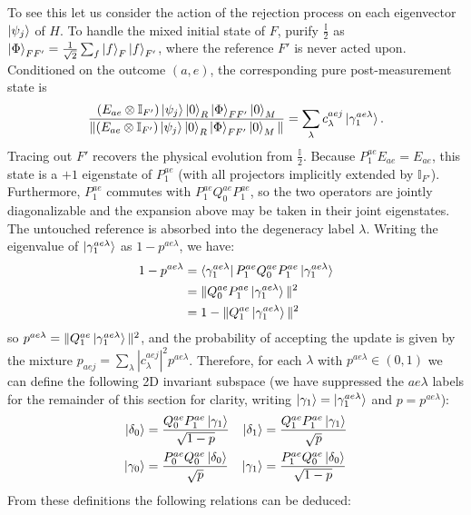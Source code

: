 \documentclass[aps,floatfix,10pt,amssymb,amsfont,amsmath,superscriptaddress,float,nofootinbib,longbibliography,nobalancelastpage,twocolumn]{revtex4-2}
\begin{document}
To see this let us consider the action of the rejection process on each eigenvector $\ket{\psi_j}$ of $H$. To handle the mixed initial state of $F$, purify $\frac{\mathbb{I}}{2}$ as $\ket{\Phi}_{FF'}=\frac{1}{\sqrt{2}}\sum_f\ket{f}_F\ket{f}_{F'}$, where the reference $F'$ is never acted upon. Conditioned on the outcome $(a,e)$, the corresponding pure post-measurement state is
\begin{equation}
    \frac{(E_{ae}\otimes\mathbb I_{F'})\ket{\psi_j}\ket{0}_R\ket{\Phi}_{FF'}\ket{0}_M}
    {\|(E_{ae}\otimes\mathbb I_{F'})\ket{\psi_j}\ket{0}_R\ket{\Phi}_{FF'}\ket{0}_M\|}
    = \sum_{\lambda} c_{\lambda}^{aej}\ket{\gamma_1^{ae \lambda}}.
\end{equation}
Tracing out $F'$ recovers the physical evolution from $\frac{\mathbb{I}}{2}$. Because $P_1^{ae}E_{ae}=E_{ae}$, this state is a $+1$ eigenstate of $P_1^{ae}$ (with all projectors implicitly extended by $\mathbb I_{F'}$). Furthermore, $P_1^{ae}$ commutes with $P^{ae}_1Q^{ae}_0P^{ae}_1$, so the two operators are jointly diagonalizable and the expansion above may be taken in their joint eigenstates. The untouched reference is absorbed into the degeneracy label $\lambda$.
Writing the eigenvalue of $\ket{\gamma^{ae\lambda}_1}$ as $1-p^{ae\lambda}$, we have: \begin{align}1-p^{ae\lambda}&=\bra{\gamma^{ae\lambda}_1}P^{ae}_1Q^{ae}_0P^{ae}_1\ket{\gamma^{ae\lambda}_1} \\&=\|Q^{ae}_0P^{ae}_1\ket{\gamma^{ae\lambda}_1}\|^2\\ &= 1-\|Q^{ae}_1\ket{\gamma^{ae\lambda}_1}\|^2
\end{align}
so $p^{ae\lambda} = \|Q^{ae}_1\ket{\gamma^{ae\lambda}_1}\|^2$, and the probability of accepting the update is given by the mixture $p_{aej} = \sum_{\lambda}|c^{aej}_{\lambda}|^2p^{ae\lambda}$. Therefore, for each $\lambda$ with $p^{ae\lambda} \in (0,1)$ we can define the following 2D invariant subspace (we have suppressed the $ae\lambda$ labels for the remainder of this section for clarity, writing $\ket{\gamma_1} = \ket{\gamma^{ae\lambda}_1}$ and $p = p^{ae\lambda}$):
\begin{align}
    \ket{\delta_0} &= \frac{Q^{ae}_0P^{ae}_1\ket{\gamma_1}}{\sqrt{1-p}} &\ket{\delta_1} &= \frac{Q^{ae}_1P^{ae}_1\ket{\gamma_1}}{\sqrt{p}} \\
    \ket{\gamma_0} &= \frac{P^{ae}_0Q^{ae}_0\ket{\delta_0}}{\sqrt{p}} &\ket{\gamma_1} &= \frac{P^{ae}_1Q^{ae}_0\ket{\delta_0}}{\sqrt{1-p}}
\end{align}
From these definitions the following relations can be deduced:
\end{document}
